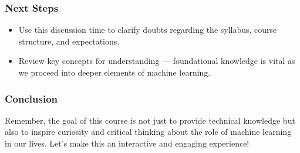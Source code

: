 \documentclass[aspectratio=169]{beamer}
\begin{document}
\begin{frame}[fragile]
    \frametitle{Next Steps}
    \begin{itemize}
        \item Use this discussion time to clarify doubts regarding the syllabus, course structure, and expectations.
        \item Review key concepts for understanding — foundational knowledge is vital as we proceed into deeper elements of machine learning.
    \end{itemize}
\end{frame}

\begin{frame}[fragile]
    \frametitle{Conclusion}
    \begin{block}{}
        Remember, the goal of this course is not just to provide technical knowledge but also to inspire curiosity and critical thinking about the role of machine learning in our lives. Let's make this an interactive and engaging experience!
    \end{block}
\end{frame}
\end{document}
